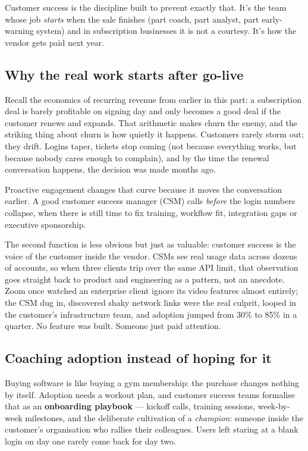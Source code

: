 Customer success is the discipline built to prevent exactly that. It's the team whose job \emph{starts} when the sale finishes (part coach, part analyst, part early-warning system) and in subscription businesses it is not a courtesy. It's how the vendor gets paid next year.



\subsection{Why the real work starts after go-live}


Recall the economics of recurring revenue from earlier in this part: a subscription deal is barely profitable on signing day and only becomes a good deal if the customer renews and expands. That arithmetic makes churn the enemy, and the striking thing about churn is how quietly it happens. Customers rarely storm out; they drift. Logins taper, tickets stop coming (not because everything works, but because nobody cares enough to complain), and by the time the renewal conversation happens, the decision was made months ago.


Proactive engagement changes that curve because it moves the conversation earlier. A good customer success manager (CSM) calls \emph{before} the login numbers collapse, when there is still time to fix training, workflow fit, integration gaps or executive sponsorship.


The second function is less obvious but just as valuable: customer success is the voice of the customer inside the vendor. CSMs see real usage data across dozens of accounts, so when three clients trip over the same API limit, that observation goes straight back to product and engineering as a pattern, not an anecdote. Zoom once watched an enterprise client ignore its video features almost entirely; the CSM dug in, discovered shaky network links were the real culprit, looped in the customer's infrastructure team, and adoption jumped from 30\% to 85\% in a quarter. No feature was built. Someone just paid attention.



\subsection{Coaching adoption instead of hoping for it}


Buying software is like buying a gym membership: the purchase changes nothing by itself. Adoption needs a workout plan, and customer success teams formalise that as an \textbf{onboarding playbook} — kickoff calls, training sessions, week-by-week milestones, and the deliberate cultivation of a \emph{champion}: someone inside the customer's organisation who rallies their colleagues. Users left staring at a blank login on day one rarely come back for day two.


